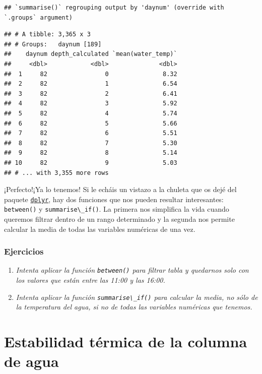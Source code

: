 \documentclass[
]{book}
\newcommand{\passthrough}[1]{#1}
\providecommand{\tightlist}{%
  \setlength{\itemsep}{0pt}\setlength{\parskip}{0pt}}
\begin{document}
\begin{lstlisting}
## `summarise()` regrouping output by 'daynum' (override with `.groups` argument)
\end{lstlisting}

\begin{lstlisting}
## # A tibble: 3,365 x 3
## # Groups:   daynum [189]
##    daynum depth_calculated `mean(water_temp)`
##     <dbl>            <dbl>              <dbl>
##  1     82                0               8.32
##  2     82                1               6.54
##  3     82                2               6.41
##  4     82                3               5.92
##  5     82                4               5.74
##  6     82                5               5.66
##  7     82                6               5.51
##  8     82                7               5.30
##  9     82                8               5.14
## 10     82                9               5.03
## # ... with 3,355 more rows
\end{lstlisting}

¡Perfecto!¡Ya lo tenemos! Si le echáis un vistazo a la chuleta que os dejé del paquete \href{https://raw.githubusercontent.com/rstudio/cheatsheets/master/data-transformation.pdf}{\passthrough{\lstinline!dplyr!}}, hay dos funciones que nos pueden resultar interesantes: \passthrough{\lstinline!between()!} y \passthrough{\lstinline!summarise\_if()!}. La primera nos simplifica la vida cuando queremos filtrar dentro de un rango determinado y la segunda nos permite calcular la media de todas las variables numéricas de una vez.

\hypertarget{ejercicios-3}{%
\subsection{Ejercicios}\label{ejercicios-3}}

\begin{enumerate}
\def\labelenumi{\arabic{enumi}.}
\tightlist
\item
  \emph{Intenta aplicar la función \passthrough{\lstinline!between()!} para filtrar tabla y quedarnos solo con los valores que están entre las 11:00 y las 16:00.}
\item
  \emph{Intenta aplicar la función \passthrough{\lstinline!summarise\_if()!} para calcular la media, no sólo de la temperatura del agua, si no de todas las variables numéricas que tenemos.}
\end{enumerate}

\hypertarget{Termoclina}{%
\chapter{Estabilidad térmica de la columna de agua}\label{Termoclina}}
\end{document}
